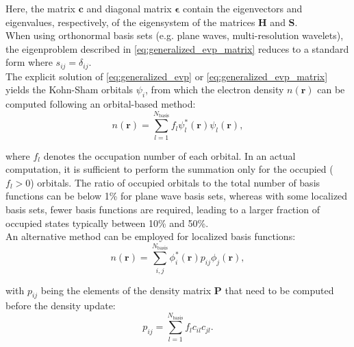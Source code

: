 \documentclass{report}
\begin{document}
\noindent Here, the matrix $\boldsymbol{c}$ and diagonal matrix $\boldsymbol{\epsilon}$ contain the eigenvectors and eigenvalues, respectively, of the eigensystem of the matrices $\boldsymbol{H}$ and $\boldsymbol{S}$.\\

When using orthonormal basis sets (e.g. plane waves, multi-resolution wavelets), the eigenproblem described in \ref{eq:generalized_evp_matrix} reduces to a standard form where $s_{ij}=\delta_{ij}$.\\

The explicit solution of \ref{eq:generalized_evp} or \ref{eq:generalized_evp_matrix} yields the Kohn-Sham orbitals $\psi_i$, from which the electron density $n(\boldsymbol{r})$ can be computed following an orbital-based method:\\
\begin{equation}
\label{eq:orbital_update}
n(\boldsymbol{r}) = \sum_{l=1}^{N_\text{basis}} f_l \psi_l^*(\boldsymbol{r}) \psi_l(\boldsymbol{r}) ,
\end{equation}

\noindent where $f_l$ denotes the occupation number of each orbital.  In an actual computation, it is sufficient to perform the summation only for the occupied ($f_l > 0$) orbitals.  The ratio of occupied orbitals to the total number of basis functions can be below 1\% for plane wave basis sets, whereas with some localized basis sets, fewer basis functions are required, leading to a larger fraction of occupied states typically between 10\% and 50\%.\\

An alternative method can be employed for localized basis functions:\\
\begin{equation}
\label{eq:density_matrix_update}
n(\boldsymbol{r}) = \sum_{i,j}^{N_\text{basis}} \phi_i^*(\boldsymbol{r}) p_{ij} \phi_j(\boldsymbol{r}) ,
\end{equation}

\noindent with $p_{ij}$ being the elements of the density matrix $\boldsymbol{P}$ that need to be computed before the density update:\\
\begin{equation}
\label{eq:density_matrix}
p_{ij} = \sum_{l=1}^{N_\text{basis}} f_l c_{il} c_{jl} .
\end{equation}
\end{document}
